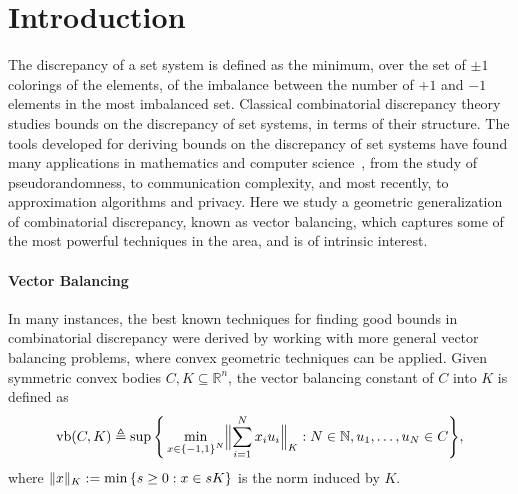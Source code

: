 \documentclass[11pt]{article}
\newcommand{\R}{{\mathbb{R}}}
\newcommand{\eqdef}{\triangleq}
\newcommand{\set}[1]{\left\{ #1 \right\}}
\DeclareMathOperator{\vb}{vb}
\DeclarePairedDelimiter\norm{\lVert}{\rVert}
\begin{document}
\thispagestyle{empty}

\newpage

\setcounter{page}{1}

\section{Introduction}

The discrepancy of a set system is defined as the minimum, over the set of $\pm 1$ colorings of the elements, of the imbalance between the number of $+1$ and $-1$ elements in the most imbalanced set. Classical combinatorial discrepancy theory studies bounds on the discrepancy of set systems, in terms of their structure. 
The tools developed for deriving bounds on the discrepancy of set
systems have found many applications in mathematics and computer
science~\cite{Matousek,Chazelle}, from the study of pseudorandomness,
to communication complexity, and most recently, to approximation
algorithms and privacy.  Here we study a geometric generalization of
combinatorial discrepancy, known as vector balancing, which captures
some of the most powerful techniques in the area, and is of intrinsic
interest. 

\paragraph{\bf Vector Balancing} In many instances, the best known techniques for finding
good bounds in combinatorial discrepancy were derived by working with more
general vector balancing problems, where convex geometric techniques can be
applied. Given symmetric convex bodies $C,K \subseteq \R^n$, the vector
balancing constant of $C$ into $K$ is defined as 
\[
\vb(C, K) \eqdef \sup\Bigg\{ 
\min_{x \in \set{-1,1}^N} \Bigl\|\sum_{i = 1}^N x_i
u_i \Bigr\|_{K}: N \in \mathbb{N}, u_1, \ldots, u_N \in C \Bigg\},
\]
where $\norm{x}_K := \min \set{s \geq 0: x \in sK}$ is the norm induced by $K$.
\end{document}
